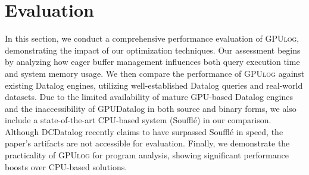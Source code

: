 \documentclass[nonacm,sigplan]{acmart}
\newcommand{\tool}{\textsc{GPUlog}}
\begin{document}

 




\section{Evaluation}
\label{sec:eval}

In this section, we conduct a comprehensive performance evaluation of \tool{}, demonstrating the impact of our optimization techniques. Our assessment begins by analyzing how eager buffer management influences both query execution time and system memory usage.
We then compare the performance of \tool{}  against existing Datalog engines, utilizing well-established Datalog queries and real-world datasets. Due to the limited availability of mature GPU-based Datalog engines and the inaccessibility of GPUDatalog \cite{martinez2013Datalog} in both source and binary forms, we also include a state-of-the-art CPU-based system (Souffl\'e) in our comparison.  Although DCDatalog \cite{wu2022dcdatalog} recently claims to have surpassed Souffl\'e in speed, the paper's artifacts are not accessible for evaluation. Finally, we demonstrate the practicality of \tool{} for program analysis, showing significant performance boosts over CPU-based solutions.
\end{document}

